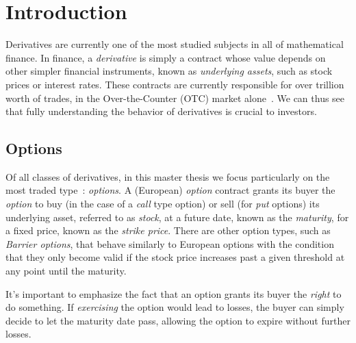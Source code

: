 
\section{Introduction}
\label{sec:intro}
Derivatives are currently one of the most studied subjects in all of mathematical finance.
In finance, a \emph{derivative} is simply a contract whose value depends on other simpler financial instruments, known as \emph{underlying assets}, such as stock prices or interest rates. These contracts are currently responsible for over  trillion worth of trades, in the Over-the-Counter (OTC) market alone~\citep{BIS}.
We can thus see that fully understanding the behavior of derivatives is crucial to investors.


\subsection{Options}
Of all classes of derivatives, in this master thesis we focus particularly on the most traded type~\citep{Hull}: \emph{options}.
A (European) \emph{option} contract grants its buyer the \emph{option} to buy (in the case of a \emph{call} type option) or sell (for \emph{put} options) its underlying asset, referred to as \emph{stock}, at a future date, known as the \emph{maturity}, for a fixed price, known as the \emph{strike price}.
There are other option types, such as \emph{Barrier options}, that behave similarly to European options with the condition that they only become valid if the stock price increases past a given threshold at any point until the maturity.


It's important to emphasize the fact that an option grants its buyer the \emph{right} to do something. If \emph{exercising} the option would lead to losses, the buyer can simply decide to let the maturity date pass, allowing the option to expire without further losses.

